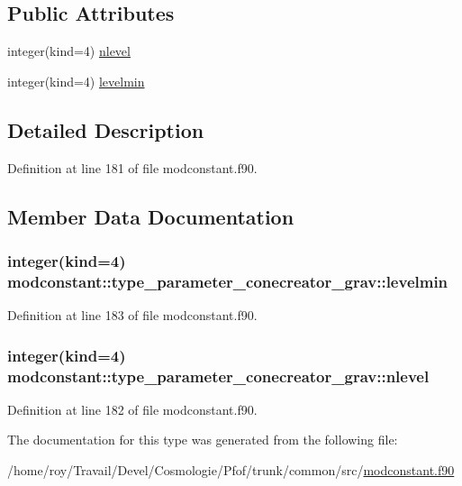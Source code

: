 \subsection*{Public Attributes}
\begin{DoxyCompactItemize}
\item 
integer(kind=4) \hyperlink{structmodconstant_1_1type__parameter__conecreator__grav_a5fbac0f79f7eadfc59bd86d9b40598df}{nlevel}
\item 
integer(kind=4) \hyperlink{structmodconstant_1_1type__parameter__conecreator__grav_a41a786f104d6c0d83ba94bf75707e8c7}{levelmin}
\end{DoxyCompactItemize}


\subsection{Detailed Description}


Definition at line 181 of file modconstant.\+f90.



\subsection{Member Data Documentation}
\subsubsection[{\texorpdfstring{levelmin}{levelmin}}]{\setlength{\rightskip}{0pt plus 5cm}integer(kind=4) modconstant\+::type\+\_\+parameter\+\_\+conecreator\+\_\+grav\+::levelmin}\hypertarget{structmodconstant_1_1type__parameter__conecreator__grav_a41a786f104d6c0d83ba94bf75707e8c7}{}\label{structmodconstant_1_1type__parameter__conecreator__grav_a41a786f104d6c0d83ba94bf75707e8c7}


Definition at line 183 of file modconstant.\+f90.

\subsubsection[{\texorpdfstring{nlevel}{nlevel}}]{\setlength{\rightskip}{0pt plus 5cm}integer(kind=4) modconstant\+::type\+\_\+parameter\+\_\+conecreator\+\_\+grav\+::nlevel}\hypertarget{structmodconstant_1_1type__parameter__conecreator__grav_a5fbac0f79f7eadfc59bd86d9b40598df}{}\label{structmodconstant_1_1type__parameter__conecreator__grav_a5fbac0f79f7eadfc59bd86d9b40598df}


Definition at line 182 of file modconstant.\+f90.



The documentation for this type was generated from the following file\+:\begin{DoxyCompactItemize}
\item 
/home/roy/\+Travail/\+Devel/\+Cosmologie/\+Pfof/trunk/common/src/\hyperlink{modconstant_8f90}{modconstant.\+f90}\end{DoxyCompactItemize}
